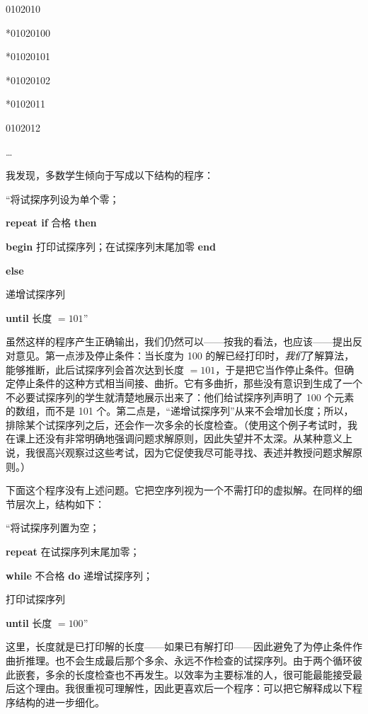 \noindent
\tabto{\parindent}0102010

\noindent
*\tabto{\parindent}01020100

\noindent
*\tabto{\parindent}01020101

\noindent
*\tabto{\parindent}01020102

\noindent
*\tabto{\parindent}0102011

\noindent
\tabto{\parindent}0102012

\dots

我发现，多数学生倾向于写成以下结构的程序：

\hspace{-.4em}``将试探序列设为单个零；

\textbf{repeat if} 合格 \textbf{then}

\quad \textbf{begin} 打印试探序列；在试探序列末尾加零 \textbf{end}

\quad\quad\quad \textbf{else}

\quad 递增试探序列

\textbf{until} 长度 $= 101$''

虽然这样的程序产生正确输出，我们仍然可以——按我的看法，也应该——提出反对意见。第一点涉及停止条件：当长度为 100 的解已经打印时，\textit{我们}了解算法，能够推断，此后试探序列会首次达到长度 $= 101$，于是把它当作停止条件。但确定停止条件的这种方式相当间接、曲折。它有多曲折，那些没有意识到生成了一个不必要试探序列的学生就清楚地展示出来了：他们给试探序列声明了 100 个元素的数组，而不是 101 个。第二点是，“递增试探序列”从来不会增加长度；所以，排除某个试探序列之后，还会作一次多余的长度检查。（使用这个例子考试时，我在课上还没有非常明确地强调问题求解原则，因此失望并不太深。从某种意义上说，我很高兴观察过这些考试，因为它促使我尽可能寻找、表述并教授问题求解原则。）

下面这个程序没有上述问题。它把空序列视为一个不需打印的虚拟解。在同样的细节层次上，结构如下：

\quad \hspace{-.4em}``将试探序列置为空；

\quad \textbf{repeat} 在试探序列末尾加零；

\quad \quad \textbf{while} 不合格 \textbf{do} 递增试探序列；

\quad \quad 打印试探序列

\quad \textbf{until} 长度 $= 100$''

这里，长度就是已打印解的长度——如果已有解打印——因此避免了为停止条件作曲折推理。也不会生成最后那个多余、永远不作检查的试探序列。由于两个循环彼此嵌套，多余的长度检查也不再发生。以效率为主要标准的人，很可能最能接受最后这个理由。我很重视可理解性，因此更喜欢后一个程序：可以把它解释成以下程序结构的进一步细化。


